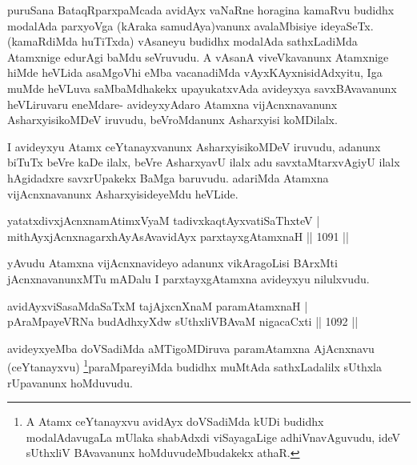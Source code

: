 \begin{artha}
puruSana BataqRparxpaMcada avidAyx vaNaRne horagina kamaRvu budidhx modalAda parxyoVga (kAraka samudAya)vanunx avalaMbisiye ideyaSeTx. (kamaRdiMda huTiTxda) vAsaneyu budidhx modalAda sathxLadiMda Atamxnige edurAgi baMdu seVruvudu. A vAsanA viveVkavanunx Atamxnige hiMde heVLida asaMgoVhi eMba vacanadiMda vAyxKAyxnisidAdxyitu, Iga muMde heVLuva saMbaMdhakekx upayukatxvAda avideyxya savxBAvavanunx heVLiruvaru eneMdare- avideyxyAdaro Atamxna vijAcnxnavanunx AsharxyisikoMDeV iruvudu, beVroMdanunx Asharxyisi koMDilalx.
\end{artha}

\begin{artha}
I avideyxyu Atamx ceYtanayxvanunx AsharxyisikoMDeV iruvudu, adanunx biTuTx beVre kaDe ilalx, beVre AsharxyavU ilalx adu savxtaMtarxvAgiyU ilalx hAgidadxre savxrUpakekx BaMga baruvudu. adariMda Atamxna vijAcnxnavanunx AsharxyisideyeMdu heVLide.
\end{artha}



\begin{shl}
yatatxdivxjAcnxnamAtimxVyaM \footnotemark[1]tadivxkaqtAyxvatiSaThxteV | \\
mithAyxjAcnxnagarxhAyAsAvavidAyx parxtayxgAtamxnaH \hfill||  1091 || 
\end{shl}

\begin{artha}
yAvudu Atamxna vijAcnxnavideyo adanunx vikAragoLisi BArxMti jAcnxnavanunxMTu mADalu I parxtayxgAtamxna avideyxyu nilulxvudu.
\end{artha}


\begin{shl}
avidAyxviSasaMdaSaTxM tajAjxcnXnaM paramAtamxnaH | \\
pAraMpayeVRNa budAdhxyXdw sUthxliVBAvaM nigacaCxti \hfill||  1092 ||  
\end{shl}

\begin{artha}
avideyxyeMba doVSadiMda aMTigoMDiruva paramAtamxna AjAcnxnavu (ceYtanayxvu) \footnote{A Atamx ceYtanayxvu avidAyx doVSadiMda kUDi budidhx modalAdavugaLa mUlaka shabAdxdi viSayagaLige adhiVnavAguvudu, ideV sUthxliV BAvavanunx hoMduvudeMbudakekx athaR.}paraMpareyiMda budidhx muMtAda sathxLadalilx sUthxla rUpavanunx hoMduvudu.
\end{artha}

